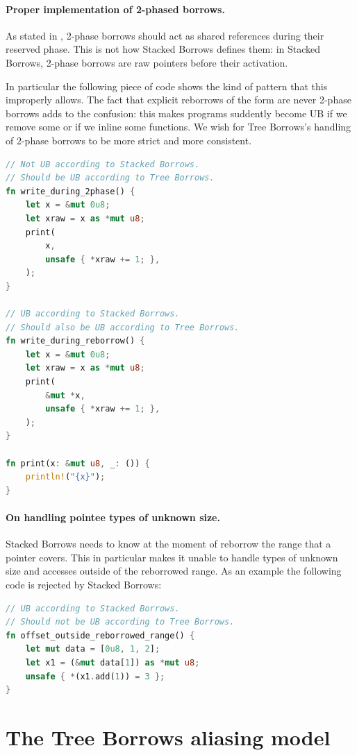 \documentclass[a4paper,11pt]{article}
\theoremstyle{plain}
\theoremstyle{definition}
\theoremstyle{remark}
\newcommand{\tcode}[1]{\rstinline{#1}}
\begin{document}
\paragraph*{Proper implementation of 2-phased borrows.}
As stated in \cite{rustc_dev_guide}, 2-phase borrows should act as shared references
during their reserved phase. This is not how Stacked Borrows defines them: in
Stacked Borrows, 2-phase borrows are raw pointers before their activation.

In particular the following piece of code shows the kind of pattern that this
improperly allows. The fact that explicit reborrows of the form \tcode{\&mut *x}
are never 2-phase borrows adds to the confusion: this makes programs suddently
become UB if we remove some \tcode{\&mut*} or if we inline some functions.
We wish for Tree Borrows's handling of 2-phase borrows to be more strict and
more consistent.
\begin{lstlisting}[language=rust]
// Not UB according to Stacked Borrows.
// Should be UB according to Tree Borrows.
fn write_during_2phase() {
    let x = &mut 0u8;
    let xraw = x as *mut u8;
    print(
        x,
        unsafe { *xraw += 1; },
    );
}

// UB according to Stacked Borrows.
// Should also be UB according to Tree Borrows.
fn write_during_reborrow() {
    let x = &mut 0u8;
    let xraw = x as *mut u8;
    print(
        &mut *x,
        unsafe { *xraw += 1; },
    );
}

fn print(x: &mut u8, _: ()) {
    println!("{x}");
}
\end{lstlisting}

\paragraph*{On handling pointee types of unknown size.}
Stacked Borrows needs to know at the moment of reborrow the range that a pointer
covers. This in particular makes it unable to handle types of unknown size and
accesses outside of the reborrowed range.
As an example the following code is rejected by Stacked Borrows:
\begin{lstlisting}[language=rust]
// UB according to Stacked Borrows.
// Should not be UB according to Tree Borrows.
fn offset_outside_reborrowed_range() {
    let mut data = [0u8, 1, 2];
    let x1 = (&mut data[1]) as *mut u8;
    unsafe { *(x1.add(1)) = 3 };
}
\end{lstlisting}

\section{The Tree Borrows aliasing model}
\end{document}
